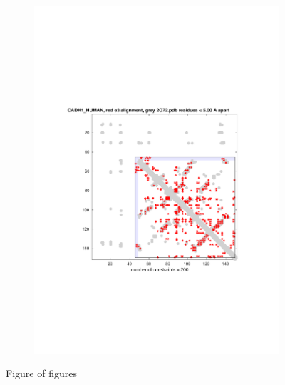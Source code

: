 \documentclass[11pt]{article}\usepackage[]{graphicx}\usepackage[]{color}
\theoremstyle{plain}
\begin{document}
\begin{multicols*}{2}
\begin{figure}[p]
\begin{subfigure}[b]{.5\textwidth}
      \includegraphics[width=\textwidth, trim=2cm 7cm 2cm 7cm, clip]{../figures/CADH1_HUMAN_e3_n2_m40_Cmap_200}
      \caption{ }
      \label{fig:human_fig4}
    \end{subfigure}%
    \caption{Figure of figures}
    \label{fig:init_figures}
  \end{figure}



\end{multicols*}
\end{document}
